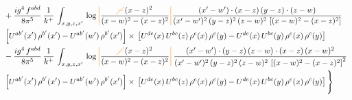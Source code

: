 \documentclass[9pt]{article}
\numberwithin{equation}{section}
\begin{document}
\begin{align}
& +\frac{ig^{4}\, f^{abd}}{8\pi^{5}}\, \frac{1}{k^{+}}\, \int_{x,y,z,x'}\,\log{\textcolor{orange}{\left|\textcolor{black}{\frac{\textcolor{orange}{\cancel{-}}\,(x-z)^{2}}{(x-w)^{2}-(x-z)^{2}}}\right|}}\frac{(x'-w')\cdot (x-z)\, (y-z)\cdot (z-w)}{(x'-w')^{2}\, (y-z)^{2}\, (z-w)^{2}\,\left[(x-w)^{2} -(x-z)^{2}\right]}\, \notag \\ & \left[U^{ab'}(x')\,\rho^{b'}(x')-U^{ab'}(w')\, \rho^{b'}(x')\right]\times\,\left[U^{de}(x)\,U^{bc}(z)\, \rho^{e}(x)\,\rho^{c}(y)-U^{de}(x)\,U^{bc}(y)\,\rho^{e}(x)\,\rho^{c}(y)\right] \notag \\
& -\frac{ig^{4}\, f^{abd}}{8\pi^{5}}\, \frac{1}{k^{+}}\, \int_{x,y,z,x'}\,\log{\textcolor{orange}{\left|\textcolor{black}{\frac{\textcolor{orange}{\cancel{-}}\,(x-z)^{2}}{(x-w)^{2}-(x-z)^{2}}}\right|}}\,\frac{(x'-w')\cdot (y-z)\, (z-w)\cdot (x-z)\,(x-w)^{2}}{(x'-w')^{2}\, (y-z)^{2}\, (z-w)^{2}\,\left[(x-w)^{2}-(x-z)^{2}\right]^{2}}\, \notag \\ & \left[U^{ab'}(x')\,\rho^{b'}(x')-U^{ab'}(w')\, \rho^{b'}(x')\right]\times\,\left[U^{de}(x)\,U^{bc}(z)\, \rho^{e}(x)\,\rho^{c}(y)-U^{de}(x)\,U^{bc}(y)\,\rho^{e}(x)\,\rho^{c}(y)\right]\Bigg\}
\end{align}
\end{document}

